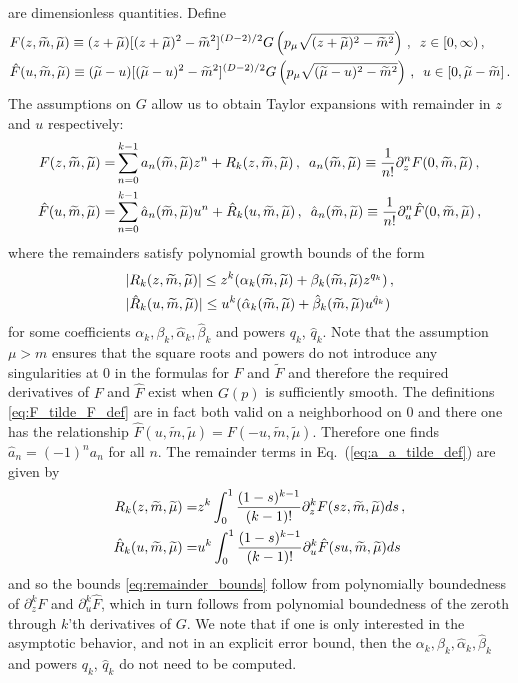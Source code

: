 \documentclass[sn-mathphys,Numbered]{sn-jnl}
\newcommand{\wt}[1]{\widetilde{#1}}
\newcommand{\req}[1]{Eq.~(\ref{#1})}
\begin{document}
are dimensionless quantities. Define
\begin{align}\label{eq:F_tilde_F_def}
  &F(z,\wt{m},\wt{\mu}) \equiv (z+\wt{\mu})[(z+\wt{\mu})^2-\wt{m}^2]^{(D-2)/2} G\left(p_\mu\sqrt{(z+\wt{\mu})^2-\wt{m}^2}\right)\,,\,\,\,z\in[0,\infty)\,,\\ 
  &\hat{F}(u,\wt{m},\wt{\mu}) \equiv (\wt{\mu}-u)[(\wt{\mu}-u)^2-\wt{m}^2]^{(D-2)/2} G\left(p_\mu\sqrt{(\wt{\mu}-u)^2-\wt{m}^2}\right)\,,\,\,\, u\in[0,\wt{\mu}-\wt{m}]\,.\notag
\end{align}
The assumptions on $G$ allow us to obtain   Taylor expansions with remainder in $z$ and $u$ respectively:
\begin{align}\label{eq:a_a_tilde_def}
F(z,\wt{m},\wt{\mu})=&\sum_{n=0}^{k-1} a_{n}(\wt{m},\wt{\mu})z^n + R_k(z,\wt{m},\wt{\mu})\,,\,\,\, a_n(\wt{m},\wt{\mu})\equiv\frac{1}{n!}\partial_z^nF(0,\wt{m},\wt{\mu})\,,\\
\hat{F}(u,\wt{m},\wt{\mu})=&\sum_{n=0}^{k-1} \hat{a}_{n}(\wt{m},\wt{\mu})u^n + \hat{R}_k(u,\wt{m},\wt{\mu})\,,\,\,\,\hat{a}_n(\wt{m},\wt{\mu})\equiv\frac{1}{n!}\partial_u^n\hat{F}(0,\wt{m},\wt{\mu})\,,\notag
\end{align}
where the remainders satisfy polynomial growth bounds of the form 
\begin{align}\label{eq:remainder_bounds}
&|R_k(z,\wt{m},\wt{\mu})|\leq z^k(\alpha_k(\wt{m},\wt{\mu})+\beta_k(\wt{m},\wt{\mu}) z^{q_k})\,,\\
&|\hat{R}_k(u,\wt{m},\wt{\mu})|\leq u^k(\hat{\alpha}_k(\wt{m},\wt{\mu})+\hat{\beta}_k(\wt{m},\wt{\mu}) u^{\hat{q}_k})\notag
\end{align}
for some coefficients $\alpha_k,\beta_k,\hat{\alpha}_k,\hat{\beta}_k$ and powers $q_k$, $\hat{q}_k$.
 Note that the assumption $\mu>m$ ensures that the square roots and powers do not introduce any singularities at $0$ in the formulas for $F$ and $\widetilde F$ and therefore the required derivatives of $F$ and $\hat{F}$ exist when $G(p)$ is sufficiently smooth.   The definitions \eqref{eq:F_tilde_F_def} are in fact both valid on a neighborhood on $0$ and there one has the relationship $\hat{F}(u,\wt{m},\wt{\mu})=F(-u,\wt{m},\wt{\mu})$. Therefore one finds  $\hat{a}_n=(-1)^n{a}_n$ for all $n$. The remainder terms in \req{eq:a_a_tilde_def} are given by
 \begin{align}
    R_k(z,\wt{m},\wt{\mu})=& z^k\int_0^1\frac{(1-s)^{k-1}}{(k-1)!}\partial^k_{z}F(sz,\wt{m},\wt{\mu})ds\,,\\
       \hat{R}_k(u,\wt{m},\wt{\mu})=& u^k\int_0^1\frac{(1-s)^{k-1}}{(k-1)!}\partial^k_{u}\hat{F}(su,\wt{m},\wt{\mu})ds\notag
 \end{align}
and so the bounds \eqref{eq:remainder_bounds} follow from polynomially boundedness of   $\partial_z^k F$ and $\partial_u^k \hat{F}$,  which in turn follows from polynomial boundedness of the zeroth through $k$'th derivatives of $G$.  We note that if one is only interested in the asymptotic behavior, and not in an explicit error bound, then the $\alpha_k,\beta_k,\hat{\alpha}_k,\hat{\beta}_k$ and powers $q_k$, $\hat{q}_k$ do not need to be computed.  
 
\end{document}
